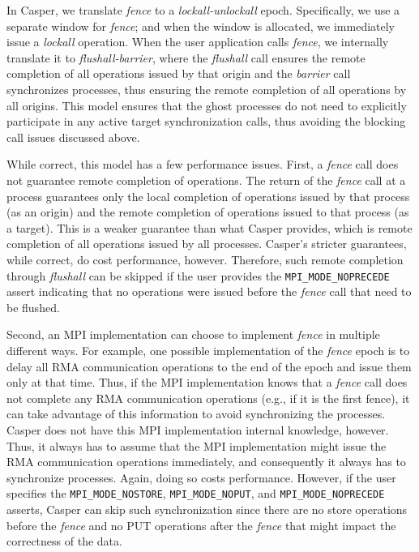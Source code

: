 In Casper, we translate \emph{fence} to a \emph{lockall-unlockall}
epoch.  Specifically, we use a separate window for \emph{fence}; and
when the window is allocated, we immediately issue a \emph{lockall}
operation.  When the user application calls \emph{fence}, we
internally translate it to \emph{flushall-barrier}, where the
\emph{flushall} call ensures the remote completion of all operations
issued by that origin and the \emph{barrier} call synchronizes
processes, thus ensuring the remote completion of all operations by all
origins.  This model ensures that the ghost processes do not need to
explicitly participate in any active target synchronization calls,
thus avoiding the blocking call issues discussed above.

While correct, this model has a few performance issues.  First, a
\emph{fence} call does not guarantee remote completion of operations.
The return of the \emph{fence} call at a process guarantees only the
local completion of operations issued by that process (as an origin)
and the remote completion of operations issued to that process (as a
target).  This is a weaker guarantee than what Casper provides,
which is remote completion of all operations issued by all processes.
Casper's stricter guarantees, while correct, do cost performance, however.
Therefore, such
remote completion through \emph{flushall} can be skipped if the user
provides the \texttt{MPI\_MODE\_NOPRECEDE} assert indicating that
no operations were issued before the \emph{fence} call that need
to be flushed.

Second, an MPI implementation can choose to implement \emph{fence} in
multiple different ways.  For example, one possible implementation of
the \emph{fence} epoch is to delay all RMA communication operations to
the end of the epoch and issue them only at that time.  Thus, if the
MPI implementation knows that a \emph{fence} call does not complete any
RMA communication operations (e.g., if it is the first fence), it can
take advantage of this information to avoid synchronizing the
processes.  Casper does not have this MPI
implementation internal knowledge, however.
Thus, it always has to assume that the
MPI implementation might issue the RMA communication operations
immediately, and consequently it always has to synchronize processes.
Again, doing so costs performance.  However, if the user specifies the
\texttt{MPI\_MODE\_NOSTORE}, \texttt{MPI\_MODE\_NOPUT}, and
\texttt{MPI\_MODE\_NOPRECEDE} asserts, Casper can skip such
synchronization since there are no store operations before the
\emph{fence} and no PUT operations after the \emph{fence} that might
impact the correctness of the data.

